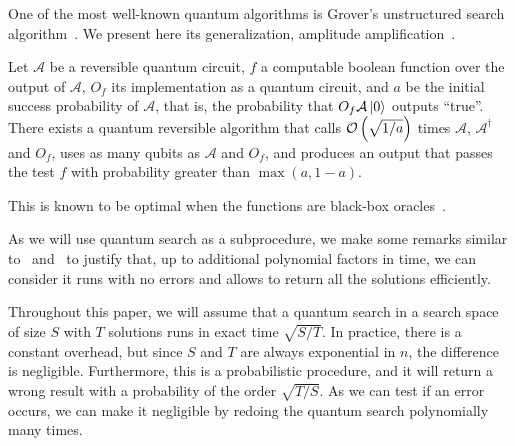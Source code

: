 One of the most well-known quantum algorithms is Grover's unstructured search algorithm~\cite{DBLP:conf/stoc/Grover96}. We present here its generalization, amplitude amplification~\cite{brassard2002quantum}.

\begin{lemma}\label{lemma:grover}
Let $\mathcal{A}$ be a reversible quantum circuit, $f$ a computable boolean function over the output of $\mathcal{A}$, $O_f$ its implementation as a quantum circuit, and $a$ be the initial success probability of $\mathcal{A}$, that is, the probability that $O_f\mathcal{A}\left| 0 \right\rangle$ outputs ``true''. There exists a quantum reversible algorithm that calls $\mathcal{O} \left(\sqrt{1/a} \right)$ times $\mathcal{A}$, $\mathcal{A}^\dagger$ and $O_f$, uses as many qubits as $\mathcal{A}$ and $O_f$, and produces an output that passes the test $f$ with probability greater than $\max(a,1-a)$.
\end{lemma}

This is known to be optimal when the functions are black-box oracles~\cite{DBLP:journals/siamcomp/BennettBBV97}.

As we will use quantum search as a subprocedure, we make some remarks similar to~\cite[Appendix A.2]{DBLP:journals/iacr/Naya-PlasenciaS19} and~\cite[Section 5.2]{DBLP:journals/tosc/BonnetainNS19} to justify that, up to additional polynomial factors in time, we can consider it runs with no errors and allows to return all the solutions efficiently.

\begin{remark}
Throughout this paper, we will assume that a quantum search in a search space of size $S$ with $T$ solutions runs in exact time $\sqrt{S/T}$. In practice, there is a constant overhead, but since $S$ and $T$ are always exponential in $n$, the difference is negligible. Furthermore, this is a probabilistic procedure, and it will return a wrong result with a probability of the order $\sqrt{T/S}$. As we can test if an error occurs, we can make it negligible by redoing the quantum search polynomially many times.
\end{remark}

